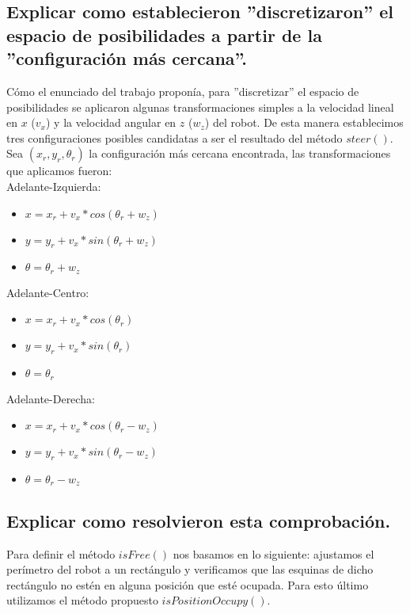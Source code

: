 \documentclass[a4paper]{article}
\theoremstyle{plain}
\theoremstyle{remark}
\theoremstyle{definition}
\begin{document}
\subsection{Explicar como establecieron ”discretizaron” el espacio de posibilidades a partir
de la ”configuración más cercana”.}

Cómo el enunciado del trabajo proponía, para ”discretizar” el espacio de posibilidades se aplicaron algunas transformaciones simples a la velocidad lineal en $x$ ($v_x$) y la velocidad angular en $z$ ($w_z$) del robot. De esta manera establecimos tres configuraciones posibles candidatas a ser el resultado del método $steer()$. \\

Sea $(x_r, y_r, \theta_r)$ la configuración más cercana encontrada, las transformaciones que aplicamos fueron: \\

Adelante-Izquierda: \\

\begin{itemize}
  \item{$x = x_r + v_x * cos(\theta_r + w_z)$}
  \item{$y = y_r + v_x * sin(\theta_r + w_z)$}
  \item{$\theta = \theta_r + w_z$}
\end{itemize}

Adelante-Centro: \\

\begin{itemize}
  \item{$x = x_r + v_x * cos(\theta_r)$}
  \item{$y = y_r + v_x * sin(\theta_r)$}
  \item{$\theta = \theta_r$}
\end{itemize}

Adelante-Derecha: \\

\begin{itemize}
  \item{$x = x_r + v_x * cos(\theta_r - w_z)$}
  \item{$y = y_r + v_x * sin(\theta_r - w_z)$}
  \item{$\theta = \theta_r - w_z$}
\end{itemize}

\subsection{Explicar como resolvieron esta comprobación.}

Para definir el método $isFree()$ nos basamos en lo siguiente: ajustamos el perímetro del robot a un rectángulo y verificamos que las esquinas de dicho rectángulo no estén en alguna posición que esté ocupada. Para esto último utilizamos el método propuesto $isPositionOccupy()$.
\end{document}
